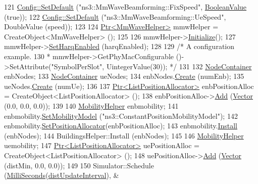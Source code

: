 \begin{DoxyCode}
121         \hyperlink{group__config_ga2e7882df849d8ba4aaad31c934c40c06}{Config::SetDefault} (\textcolor{stringliteral}{"ns3::MmWaveBeamforming::FixSpeed"}, 
      \hyperlink{classns3_1_1BooleanValue}{BooleanValue} (\textcolor{keyword}{true}));
122         \hyperlink{group__config_ga2e7882df849d8ba4aaad31c934c40c06}{Config::SetDefault} (\textcolor{stringliteral}{"ns3::MmWaveBeamforming::UeSpeed"}, DoubleValue (speed));
123 
124   \hyperlink{classns3_1_1Ptr}{Ptr<MmWaveHelper>} mmwHelper = CreateObject<MmWaveHelper> ();
125 
126   mmwHelper->\hyperlink{classns3_1_1Object_af4411cb29971772fcd09203474a95078}{Initialize}();
127   mmwHelper->\hyperlink{classns3_1_1MmWaveHelper_af211a02952ab5f4eabe0219cf53e7e1c}{SetHarqEnabled} (harqEnabled);
128 
129   \textcolor{comment}{/* A configuration example.}
130 \textcolor{comment}{   * mmwHelper->GetPhyMacConfigurable ()->SetAttribute("SymbolPerSlot", UintegerValue(30)); */}
131 
132   \hyperlink{classns3_1_1NodeContainer}{NodeContainer} enbNodes;
133   \hyperlink{classns3_1_1NodeContainer}{NodeContainer} ueNodes;
134   enbNodes.\hyperlink{classns3_1_1NodeContainer_a787f059e2813e8b951cc6914d11dfe69}{Create} (numEnb);
135   ueNodes.\hyperlink{classns3_1_1NodeContainer_a787f059e2813e8b951cc6914d11dfe69}{Create} (numUe);
136 
137   \hyperlink{classns3_1_1Ptr}{Ptr<ListPositionAllocator>} enbPositionAlloc = 
      CreateObject<ListPositionAllocator> ();
138   enbPositionAlloc->\hyperlink{classns3_1_1ListPositionAllocator_a460e82f015ac012a73ba0ea0cccb3486}{Add} (\hyperlink{classns3_1_1Vector3D_a7e59b47bc94c9cb1dadff68c1d0112d8}{Vector} (0.0, 0.0, 0.0));
139 
140   \hyperlink{classns3_1_1MobilityHelper}{MobilityHelper} enbmobility;
141   enbmobility.\hyperlink{classns3_1_1MobilityHelper_a030275011b6f40682e70534d30280aba}{SetMobilityModel} (\textcolor{stringliteral}{"ns3::ConstantPositionMobilityModel"});
142   enbmobility.\hyperlink{classns3_1_1MobilityHelper_ac59d5295076be3cc11021566713a28c5}{SetPositionAllocator}(enbPositionAlloc);
143   enbmobility.\hyperlink{classns3_1_1MobilityHelper_a07737960ee95c0777109cf2994dd97ae}{Install} (enbNodes);
144   BuildingsHelper::Install (enbNodes);
145 
146   \hyperlink{classns3_1_1MobilityHelper}{MobilityHelper} uemobility;
147   \hyperlink{classns3_1_1Ptr}{Ptr<ListPositionAllocator>} uePositionAlloc = 
      CreateObject<ListPositionAllocator> ();
148   uePositionAlloc->\hyperlink{classns3_1_1ListPositionAllocator_a460e82f015ac012a73ba0ea0cccb3486}{Add} (\hyperlink{classns3_1_1Vector3D_a7e59b47bc94c9cb1dadff68c1d0112d8}{Vector} (distMin, 0.0, 0.0));
149 
150   Simulator::Schedule (\hyperlink{group__timecivil_gaf26127cf4571146b83a92ee18679c7a9}{MilliSeconds}(\hyperlink{mmwave-tdma_8cc_a5366a103b1af38305a434287c90c58b9}{distUpdateInterval}), &

\end{DoxyCode}
